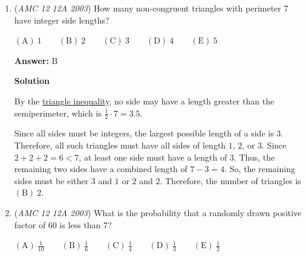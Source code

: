 \begin{enumerate}
 $\mathrm{(A) \ } x \heartsuit y = y \heartsuit x$ for all $x$ and $y$
$\mathrm{(B) \ } 2(x \heartsuit y) = (2x) \heartsuit (2y)$ for all $x$ and $y$
$\mathrm{(C) \ } x \heartsuit 0 = x$ for all $x$
$\mathrm{(D) \ } x \heartsuit x = 0$ for all $x$
$\mathrm{(E) \ } x \heartsuit y > 0$ if $x \neq y$

 \textbf{Answer: }C



\textbf{Solution}

We start by looking at the answers. Examining statement C, we notice:

 $x \heartsuit 0 = |x-0| = |x|$
$|x| \neq x$ when $x<0$, but statement C says that it does for all $x$. 

 Therefore the statement that is not true is $\boxed{\mathrm{(C)}\ x\heartsuit 0=x\ \text{for all}\ x}$



	\item (\textit{AMC 12 12A 2003}) How many non-congruent triangles with perimeter $7$ have integer side lengths? 


 $\mathrm{(A) \ } 1\qquad \mathrm{(B) \ } 2\qquad \mathrm{(C) \ } 3\qquad \mathrm{(D) \ } 4\qquad \mathrm{(E) \ } 5$

 \textbf{Answer: }B



\textbf{Solution}

By the \href{https://artofproblemsolving.com/wiki/index.php?title=Triangle\_inequality}{triangle inequality}, no side may have a length greater than the semiperimeter, which is $\frac{1}{2}\cdot7=3.5$. 

 Since all sides must be integers, the largest possible length of a side is $3$. Therefore, all such triangles must have all sides of length $1$, $2$, or $3$. Since $2+2+2=6<7$, at least one side must have a length of $3$. Thus, the remaining two sides have a combined length of $7-3=4$. So, the remaining sides must be either $3$ and $1$ or $2$ and $2$. Therefore, the number of triangles is $\boxed{\mathrm{(B)}\ 2}$.

 


	\item (\textit{AMC 12 12A 2003}) What is the probability that a randomly drawn positive factor of $60$ is less than $7$?


 $\mathrm{(A) \ } \frac{1}{10}\qquad \mathrm{(B) \ } \frac{1}{6}\qquad \mathrm{(C) \ } \frac{1}{4}\qquad \mathrm{(D) \ } \frac{1}{3}\qquad \mathrm{(E) \ } \frac{1}{2}$


\end{enumerate}
